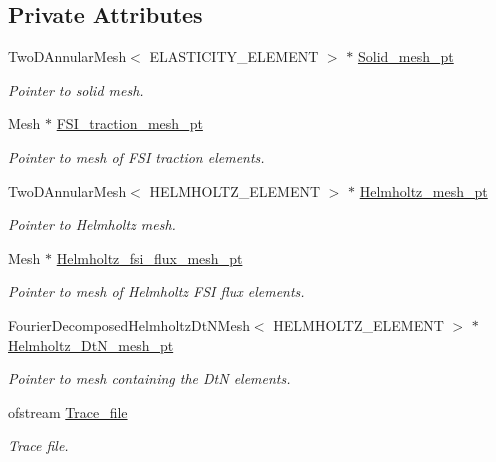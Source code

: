 \subsection*{Private Attributes}
\begin{DoxyCompactItemize}
\item 
Two\+D\+Annular\+Mesh$<$ E\+L\+A\+S\+T\+I\+C\+I\+T\+Y\+\_\+\+E\+L\+E\+M\+E\+NT $>$ $\ast$ \hyperlink{classCoatedSphereProblem_a4bba1d667061b296208039207bd3347d}{Solid\+\_\+mesh\+\_\+pt}
\begin{DoxyCompactList}\small\item\em Pointer to solid mesh. \end{DoxyCompactList}\item 
Mesh $\ast$ \hyperlink{classCoatedSphereProblem_a4bb400e47b8d3713bfd5e27ae2c89683}{F\+S\+I\+\_\+traction\+\_\+mesh\+\_\+pt}
\begin{DoxyCompactList}\small\item\em Pointer to mesh of F\+SI traction elements. \end{DoxyCompactList}\item 
Two\+D\+Annular\+Mesh$<$ H\+E\+L\+M\+H\+O\+L\+T\+Z\+\_\+\+E\+L\+E\+M\+E\+NT $>$ $\ast$ \hyperlink{classCoatedSphereProblem_a73e496c225b61138eca66e652e1c5d22}{Helmholtz\+\_\+mesh\+\_\+pt}
\begin{DoxyCompactList}\small\item\em Pointer to Helmholtz mesh. \end{DoxyCompactList}\item 
Mesh $\ast$ \hyperlink{classCoatedSphereProblem_aef75017cfe8c77449e00f8f70aa4dcef}{Helmholtz\+\_\+fsi\+\_\+flux\+\_\+mesh\+\_\+pt}
\begin{DoxyCompactList}\small\item\em Pointer to mesh of Helmholtz F\+SI flux elements. \end{DoxyCompactList}\item 
Fourier\+Decomposed\+Helmholtz\+Dt\+N\+Mesh$<$ H\+E\+L\+M\+H\+O\+L\+T\+Z\+\_\+\+E\+L\+E\+M\+E\+NT $>$ $\ast$ \hyperlink{classCoatedSphereProblem_abb33720ab0a096c5e1d6be33310bff21}{Helmholtz\+\_\+\+Dt\+N\+\_\+mesh\+\_\+pt}
\begin{DoxyCompactList}\small\item\em Pointer to mesh containing the DtN elements. \end{DoxyCompactList}\item 
ofstream \hyperlink{classCoatedSphereProblem_a79847476b26744153c0359041a52a270}{Trace\+\_\+file}
\begin{DoxyCompactList}\small\item\em Trace file. \end{DoxyCompactList}\item 

\end{DoxyCompactItemize}
